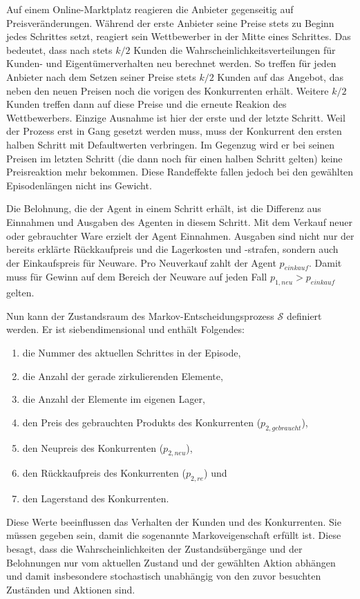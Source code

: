 Auf einem Online-Marktplatz reagieren die Anbieter gegenseitig auf Preisveränderungen.
Während der erste Anbieter seine Preise stets zu Beginn jedes Schrittes setzt, reagiert sein Wettbewerber in der Mitte eines Schrittes.
Das bedeutet, dass nach stets $k/2$ Kunden die Wahrscheinlichkeitsverteilungen für Kunden- und Eigentümerverhalten neu berechnet werden.
So treffen für jeden Anbieter nach dem Setzen seiner Preise stets $k/2$ Kunden auf das Angebot, das neben den neuen Preisen noch die vorigen des Konkurrenten erhält.
Weitere $k/2$ Kunden treffen dann auf diese Preise und die erneute Reakion des Wettbewerbers.
Einzige Ausnahme ist hier der erste und der letzte Schritt.
Weil der Prozess erst in Gang gesetzt werden muss, muss der Konkurrent den ersten halben Schritt mit Defaultwerten verbringen.
Im Gegenzug wird er bei seinen Preisen im letzten Schritt (die dann noch für einen halben Schritt gelten) keine Preisreaktion mehr bekommen.
Diese Randeffekte fallen jedoch bei den gewählten Episodenlängen nicht ins Gewicht.

Die Belohnung, die der Agent in einem Schritt erhält, ist die Differenz aus Einnahmen und Ausgaben des Agenten in diesem Schritt.
Mit dem Verkauf neuer oder gebrauchter Ware erzielt der Agent Einnahmen.
Ausgaben sind nicht nur der bereits erklärte Rückkaufpreis und die Lagerkosten und -strafen, sondern auch der Einkaufspreis für Neuware.
Pro Neuverkauf zahlt der Agent $p_{einkauf}$.
Damit muss für Gewinn auf dem Bereich der Neuware auf jeden Fall $p_{1, neu} > p_{einkauf}$ gelten.

Nun kann der Zustandsraum des Markov-Entscheidungsprozess $\mathcal{S}$ definiert werden.
Er ist siebendimensional und enthält Folgendes:
\begin{enumerate}
	\item die Nummer des aktuellen Schrittes in der Episode,
	\item die Anzahl der gerade zirkulierenden Elemente,
	\item die Anzahl der Elemente im eigenen Lager,
	\item den Preis des gebrauchten Produkts des Konkurrenten ($p_{2, gebraucht}$),
	\item den Neupreis des Konkurrenten ($p_{2, neu}$),
	\item den Rückkaufpreis des Konkurrenten ($p_{2, re}$) und
	\item den Lagerstand des Konkurrenten.
\end{enumerate}
Diese Werte beeinflussen das Verhalten der Kunden und des Konkurrenten.
Sie müssen gegeben sein, damit die sogenannte Markoveigenschaft erfüllt ist.
Diese besagt, dass die Wahrscheinlichkeiten der Zustandsübergänge und der Belohnungen nur vom aktuellen Zustand und der gewählten Aktion abhängen und damit insbesondere stochastisch unabhängig von den zuvor besuchten Zuständen und Aktionen sind.

